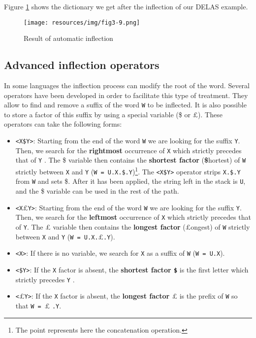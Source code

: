 \bigskip
\noindent Figure \ref{fig-inflection-result} shows the dictionary we get after the inflection of 
our DELAS example.

\bigskip
\begin{figure}[!ht]
\begin{center}
\texttt{[image: resources/img/fig3-9.png]}
\caption{Result of automatic inflection\label{fig-inflection-result}}
\end{center}
\end{figure}
\subsection{Advanced inflection operators}
\label{advanced-inflection-operators}

In some languages the inflection process can modify the root of the word.
Several operators have been developed in order to facilitate this type of treatment. 
They allow to find and remove a suffix of the word \verb+W+ to be inflected.
It is also possible to store a factor of this suffix by using a special variable (\$ or ${\pounds}$).
These operators can take the following forms:

\begin{itemize}
\item \verb+<X$Y>+: Starting from the end of the word \verb+W+  we are looking for the suffix \verb+Y+.
	Then, we search for the {\bf rightmost} occurrence of \verb+X+ which strictly precedes that 
	of  \verb+Y+ . The \$ variable then contains the {\bf shortest factor}
	({\bf\$}hortest) of \verb+W+ strictly between \verb+X+ and \verb+Y+ (\verb+W = U.X.$.Y+)\footnote{The point
	represents here the concatenation operation.}.
	The \verb+<X$Y>+ operator strips \verb+X.$.Y+ from \verb+W+ and sets \$. After it has been applied, the string
	left in the stack is \verb+U+, and the \$ variable can be used in the rest of the path.
\item \verb+<X+${\pounds}$\verb+Y>+:  Starting from the end of the word \verb+W+
	we are looking for the suffix \verb+Y+.
	Then, we search for the {\bf leftmost} occurrence of \verb+X+ which strictly precedes that of \verb+Y+.
	The {\pounds}  variable then contains the  {\bf longest factor}
	({\bf${\pounds}$}ongest) of \verb+W+ strictly between
	\verb+X+ and \verb+Y+ (\verb+W = U.X.+${\pounds}$\verb+.Y+).
\item \verb+<X>+: If there is no variable, we search for \verb+X+ as a suffix of \verb+W+
	(\verb+W = U.X+).
\item \verb+<$Y>+: If the \verb+X+ factor is absent,
	the {\bf shortest factor \verb+$+} is the first letter which strictly precedes \verb+Y+ .
\item \verb+<+${\pounds}$\verb+Y>+: If the \verb+X+ factor is absent,
	the {\bf longest factor ${\pounds}$} is the prefix of
	\verb+W+ so that  \verb+W = +${\pounds}$ \verb+.Y+.
\end{itemize}

